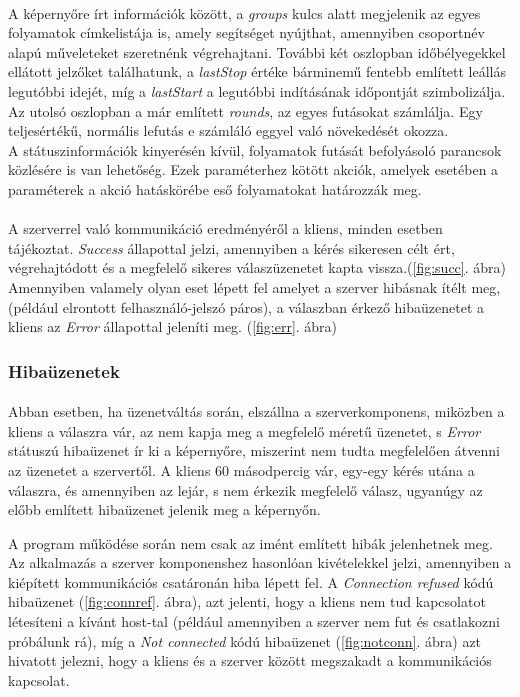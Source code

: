 \documentclass[12pt]{report}
\begin{document}
  \paragraph{}
  A képernyőre írt információk között, a \textit{groups} kulcs alatt megjelenik az egyes folyamatok címkelistája is, amely segítséget nyújthat, amennyiben csoportnév alapú műveleteket szeretnénk végrehajtani. 
  További két oszlopban időbélyegekkel ellátott jelzőket találhatunk, a \textit{lastStop} értéke bárminemű fentebb említett leállás legutóbbi idejét, míg a \textit{lastStart} a legutóbbi indításának időpontját szimbolizálja.
  Az utolsó oszlopban a már említett \textit{rounds}, az egyes futásokat számlálja. Egy teljesértékű, normális lefutás e számláló eggyel való növekedését okozza.
 \\
 A státuszinformációk kinyerésén kívül, folyamatok futását befolyásoló parancsok közlésére is van lehetőség. Ezek paraméterhez kötött akciók, amelyek esetében a paraméterek a akció hatáskörébe eső folyamatokat határozzák meg.
 \paragraph{}
 A szerverrel való kommunikáció eredményéről a kliens, minden esetben tájékoztat. \textit{Success} állapottal jelzi, amennyiben a kérés sikeresen célt ért, végrehajtódott és a megfelelő sikeres válaszüzenetet kapta vissza.(\ref{fig:succ}. ábra) 
Amennyiben valamely olyan eset lépett fel amelyet a szerver hibásnak ítélt meg, (például elrontott felhasználó-jelszó páros), a válaszban érkező hibaüzenetet a kliens az \textit{Error} állapottal jeleníti meg. (\ref{fig:err}. ábra)
  
  \subsubsection{Hibaüzenetek}
  \paragraph{}
 Abban esetben, ha üzenetváltás során, elszállna a szerverkomponens, miközben a kliens a válaszra vár, az nem kapja meg a megfelelő méretű üzenetet, s \textit{Error} státuszú hibaüzenet ír ki a képernyőre, miszerint nem tudta megfelelően átvenni az üzenetet a szervertől. A kliens 60 másodpercig vár, egy-egy kérés utána a válaszra, és amennyiben az lejár, s nem érkezik megfelelő válasz, ugyanúgy az előbb említett hibaüzenet jelenik meg a képernyőn. 
 
  A program működése során nem csak az imént említett hibák jelenhetnek meg. Az alkalmazás a szerver komponenshez hasonlóan kivételekkel jelzi, amennyiben a kiépített kommunikációs csatáronán hiba lépett fel. 
  A \textit{Connection refused} kódú hibaüzenet (\ref{fig:connref}. ábra), azt jelenti, hogy a kliens nem tud kapcsolatot létesíteni a kívánt host-tal (például amennyiben a szerver nem fut és csatlakozni próbálunk rá), míg a \textit{Not connected} kódú hibaüzenet (\ref{fig:notconn}. ábra) azt hivatott jelezni, hogy a kliens és a szerver között megszakadt a kommunikációs kapcsolat.
  
\end{document}
